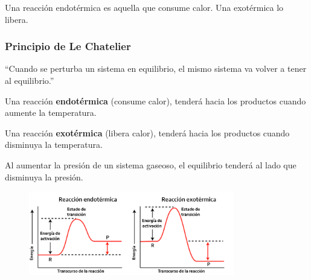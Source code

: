 Una reacción endotérmica es aquella que consume calor. Una exotérmica lo libera.

\subsubsection*{Principio de Le Chatelier}

``Cuando se perturba un sistema en equilibrio, el mismo sistema va volver a tener al equilibrio.''

Una reacción \textbf{endotérmica} (consume calor), tenderá hacia los productos cuando aumente la temperatura.

Una reacción \textbf{exotérmica} (libera calor), tenderá hacia los productos cuando disminuya la temperatura.

Al aumentar la presión de un sistema gaseoso, el equilibrio tenderá al lado que disminuya la presión.

\begin{figure}[H]
    \centering
    \includegraphics[width=0.8\textwidth]{Images/energia-activacion.png}
\end{figure}
